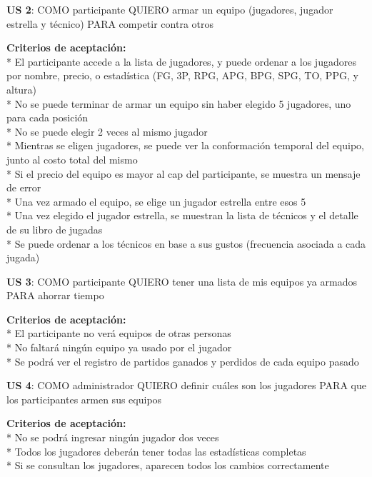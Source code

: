 \begin{tcolorbox}
\textbf{US 2}: COMO participante QUIERO armar un equipo (jugadores, jugador estrella y técnico) PARA competir contra otros

\vline

\textbf{Criterios de aceptación:}\\
* El participante accede a la lista de jugadores, y puede ordenar a los jugadores por nombre, precio, o estadística (FG, 3P, RPG, APG, BPG, SPG, TO, PPG, y altura) \\
* No se puede terminar de armar un equipo sin haber elegido 5 jugadores, uno para cada posición  \\
* No se puede elegir 2 veces al mismo jugador  \\
* Mientras se eligen jugadores, se puede ver la conformación temporal del equipo, junto al costo total del mismo  \\
* Si el precio del equipo es mayor al cap del participante, se muestra un mensaje de error  \\
* Una vez armado el equipo, se elige un jugador estrella entre esos 5  \\
* Una vez elegido el jugador estrella, se muestran la lista de técnicos y el detalle de su libro de jugadas  \\
* Se puede ordenar a los técnicos en base a sus gustos (frecuencia asociada a cada jugada)  \\
\end{tcolorbox}
\vspace{10pt}

\begin{tcolorbox}
\textbf{US 3}: COMO participante QUIERO tener una lista de mis equipos ya armados PARA ahorrar tiempo

\vline

\textbf{Criterios de aceptación:}\\
* El participante no verá equipos de otras personas\\
* No faltará ningún equipo ya usado por el jugador\\
* Se podrá ver el registro de partidos ganados y perdidos de cada equipo pasado\\
\end{tcolorbox}
\vspace{10pt}


\begin{tcolorbox}
\textbf{US 4}: COMO administrador QUIERO definir cuáles son los jugadores PARA que los participantes armen sus equipos

\vline

\textbf{Criterios de aceptación:}\\
* No se podrá ingresar ningún jugador dos veces \\
* Todos los jugadores deberán tener todas las estadísticas completas \\
* Si se consultan los jugadores, aparecen todos los cambios correctamente \\
\end{tcolorbox}
\vspace{10pt}

